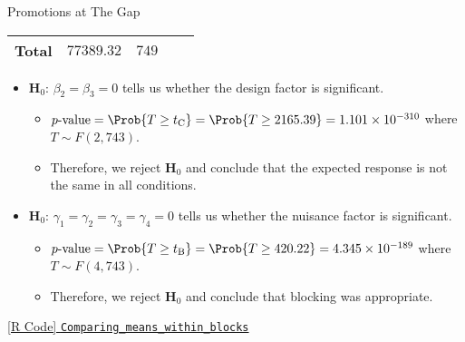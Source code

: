 \begin{Example}{Promotions at The Gap}{}
\begin{center}
\begin{NiceTabular}{|l|c|c|c|c|}
                  \midrule
                  Total     & $ 77389.32 $ & $ 749 $\\
                  \bottomrule
            \end{NiceTabular}
      \end{center}
      \begin{itemize}
            \item $ \mathbf{H}_0 $: $ \beta_2=\beta_3=0 $ tells us whether the design factor is significant.
                  \begin{itemize}
                        \item $ p\text{-value}=\Prob{T\ge t_\text{C}}=\Prob{T\ge 2165.39}=1.101\times 10^{-310} $ where $ T \sim F(2,743) $.
                        \item Therefore, we reject $ \mathbf{H}_0 $ and conclude that the expected response is not the same in all conditions.
                  \end{itemize}
            \item $ \mathbf{H}_0 $: $ \gamma_1=\gamma_2=\gamma_3=\gamma_4=0 $ tells us whether the nuisance factor is significant.
                  \begin{itemize}
                        \item $ p\text{-value}=\Prob{T\ge t_\text{B}}=\Prob{T\ge 420.22}=4.345\times 10^{-189} $ where $ T \sim F(4,743) $.
                        \item Therefore, we reject $ \mathbf{H}_0 $ and conclude that blocking was appropriate.
                  \end{itemize}
      \end{itemize}
      \href{https://github.com/Hextical/university-notes/blob/master/year-3/semester-3/STAT 430/code/W5/Comparing_means_within_blocks.R}{[R Code] \texttt{Comparing\_means\_within\_blocks}}
\end{Example}
